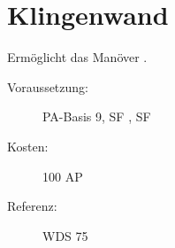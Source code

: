 \section{Klingenwand}
\label{sf.klingenwand}
Ermöglicht das Manöver .
\begin{description}
    \item[Voraussetzung:]
        PA-Basis 9, SF , SF 
    \item [Kosten:]
        100 AP
    \item [Referenz:]
        WDS 75
\end{description}

